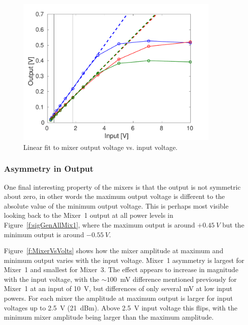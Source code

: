 \begin{figure}
  \centering
  \includegraphics[width=0.9\textwidth]{Figures/phaseMons/LinFitMixerVsVolts}
  \caption{Linear fit to mixer output voltage vs. input voltage.}
  \label{f:LinFitMixerVsVolts}
\end{figure}


\subsubsection{Asymmetry in Output}

One final interesting property of the mixers is that the output is not symmetric about zero, in other words the maximum output voltage is different to the absolute value of the minimum output voltage. This is perhaps most visible looking back to the Mixer~1 output at all power levels in Figure~\ref{f:sigGenAllMix1}, where the maximum output is around \(+0.45~V\) but the minimum output is around \(-0.55~V\).

Figure~\ref{f:MixerVsVolts} shows how the mixer amplitude at maximum and minimum output varies with the input voltage. Mixer~1 asymmetry is largest for Mixer~1 and smallest for Mixer~3. The effect appears to increase in magnitude with the input voltage, with the \(\sim100\)~mV difference mentioned previously for Mixer~1 at an input of 10~V, but differences of only several mV at low input powers. For each mixer the amplitude at maximum output is larger for input voltages up to 2.5~V (21~dBm). Above 2.5~V input voltage this flips, with the minimum mixer amplitude being larger than the maximum amplitude.

